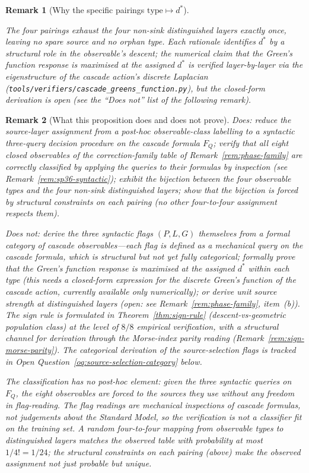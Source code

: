 \documentclass[12pt,a4paper]{article}
\newtheorem*{remark}{Remark}
\begin{document}
\begin{remark}[Why the specific pairings $\text{type}\mapsto d^*$]
\begin{itemize}
\end{itemize}
The four pairings exhaust the four non-sink distinguished layers exactly once, leaving no spare source and no orphan type. Each rationale identifies $d^*$ by a \emph{structural} role in the observable's descent; the \emph{numerical} claim that the Green's function response is maximised at the assigned $d^*$ is verified layer-by-layer via the eigenstructure of the cascade action's discrete Laplacian (\texttt{tools/verifiers/cascade\_greens\_function.py}), but the closed-form derivation is open (see the ``Does not'' list of the following remark).
\end{remark}

\begin{remark}[What this proposition does and does not prove]
\emph{Does:} reduce the source-layer assignment from a post-hoc
observable-class labelling to a syntactic three-query decision
procedure on the cascade formula $F_Q$; verify that all eight closed
observables of the correction-family table of
Remark~\ref{rem:phase-family} are correctly classified by applying
the queries to their formulas by inspection (see
Remark~\ref{rem:sp36-syntactic}); exhibit the bijection between the
four observable types and the four non-sink distinguished layers;
show that the bijection is forced by structural constraints on each
pairing (no other four-to-four assignment respects them).

\emph{Does not:} derive the three syntactic flags $(P,L,G)$
themselves from a formal category of cascade observables---each flag
is defined as a mechanical query on the cascade formula, which is
structural but not yet fully categorical; formally prove that the
Green's function response is maximised at the assigned $d^*$ within
each type (this needs a closed-form expression for the discrete
Green's function of the cascade action, currently available only
numerically); or derive unit source strength at distinguished layers
(open: see Remark~\ref{rem:phase-family}, item~(b)). The sign rule is
formulated in Theorem~\ref{thm:sign-rule} (descent-vs-geometric
population class) at the level of $8/8$ empirical verification, with a
structural channel for derivation through the Morse-index parity reading
(Remark~\ref{rem:sign-morse-parity}). The categorical derivation of
the source-selection flags is tracked in Open
Question~\ref{oq:source-selection-category} below.

The classification has no post-hoc element: given the three syntactic
queries on $F_Q$, the eight observables are forced to the sources they
use without any freedom in flag-reading. The flag readings are
mechanical inspections of cascade formulas, not judgements about the
Standard Model, so the verification is not a classifier fit on the
training set. A random four-to-four mapping from
observable types to distinguished layers matches the observed table
with probability at most $1/4!=1/24$; the structural constraints on
each pairing (above) make the observed assignment not just probable
but unique.
\end{remark}
\end{document}
